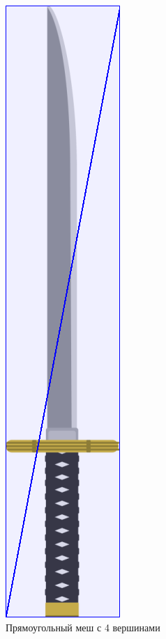 \documentclass{fefu_thesis/cls/fefu}
\begin{document}
    \begin{figure}[H]
        \centering
        \begin{subfigure}[c]{.49\linewidth}
            \centering
            \includegraphics{images/katana_rect.png}
            \caption{Прямоугольный меш с 4 вершинами}
        \end{subfigure}
        \begin{subfigure}[c]{.49\linewidth}
            \centering

\end{subfigure}
\end{figure}
\end{document}
